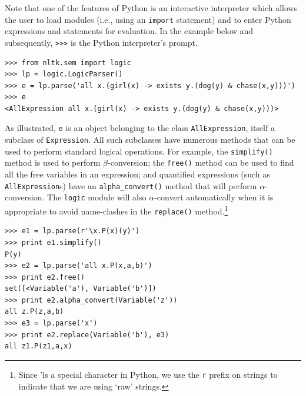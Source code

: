 \documentclass[11pt,a4paper]{article}
\newcommand{\dhgcode}[1]{{\tt #1}}
\begin{document}
Note that one of the features of Python is an interactive interpreter
which allows the user to load modules (i.e., using an \texttt{import}
statement) and to enter Python expressions and statements for
evaluation. In the example below and subsequently, \verb!>>>! is the
Python interpreter's prompt. 
\begin{verbatim}
>>> from nltk.sem import logic
>>> lp = logic.LogicParser()
>>> e = lp.parse('all x.(girl(x) -> exists y.(dog(y) & chase(x,y)))')
>>> e
<AllExpression all x.(girl(x) -> exists y.(dog(y) & chase(x,y)))>
\end{verbatim}

As illustrated, \texttt{e} is an object belonging to the class
\texttt{AllExpression}, itself a subclass of \texttt{Expression}.  All
such subclasses have numerous methods that can be used to perform
standard logical operations. For example, the \dhgcode{simplify()}
method is used to perform $\beta$-conversion; the \dhgcode{free()}
method can be used to find all the free variables in an expression;
and quantified expressions (such as \texttt{AllExpression}s) have an
\dhgcode{alpha\_convert()} method that will perform
$\alpha$-conversion.  The \texttt{logic} module will also $\alpha$-convert
automatically when it is appropriate to avoid name-clashes in the
\dhgcode{replace()} method.\footnote{Since '\` is a special character
  in Python, we use the \texttt{r} prefix on strings to indicate that
  we are using `raw' strings.}

\begin{verbatim}
>>> e1 = lp.parse(r'\x.P(x)(y)')
>>> print e1.simplify()
P(y)
>>> e2 = lp.parse('all x.P(x,a,b)')
>>> print e2.free()
set([<Variable('a'), Variable('b')])
>>> print e2.alpha_convert(Variable('z'))
all z.P(z,a,b)
>>> e3 = lp.parse('x')
>>> print e2.replace(Variable('b'), e3)
all z1.P(z1,a,x)
\end{verbatim}


\end{document}
